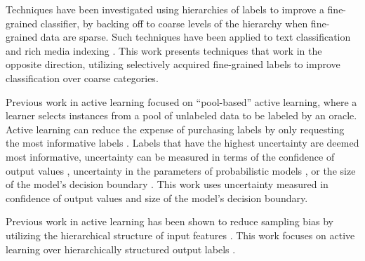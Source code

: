 \documentclass[ms]{nuthesis}
\begin{document}
\par Techniques have been investigated using hierarchies of labels to improve
  a fine-grained classifier, by backing off to coarse levels of the hierarchy
  when fine-grained data are sparse. Such techniques have been applied to
  text classification \cite{mccallum1998improving} and rich media indexing
  \cite{jiang2013}. This work presents techniques that work in the opposite
  direction, utilizing selectively acquired fine-grained labels to improve
  classification over coarse categories.

\par Previous work in active learning
focused on ``pool-based'' active learning, where a learner selects
instances from a pool of unlabeled data to be labeled by an oracle.
Active learning can reduce the expense of purchasing labels by only
requesting the most informative labels \cite{Rubens2011}. Labels that
have the highest uncertainty are deemed most informative, uncertainty
can be measured in terms of the confidence of output values
\cite{Merialdo2001}, uncertainty in the parameters of probabilistic models
\cite{Hofmann2003}, or the size of the model's decision boundary
\cite{Schohn2000}. This work uses uncertainty measured in confidence of
output values and size of the model's decision boundary.

\par Previous work in active learning has been shown to reduce
sampling bias by utilizing the hierarchical structure of input
features \cite{Dasgupta2008, Symons2006}. This work focuses on
active learning over hierarchically structured output
labels \cite{yugi}.
\end{document}
